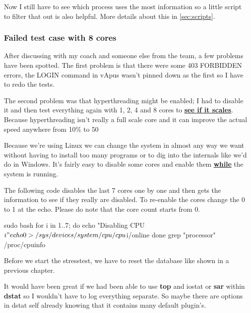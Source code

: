 Now I still have to see which process uses the most information so a little script to filter that out is also helpful. More details about this in \autoref{sec:scripts}.
\subsubsection{Failed test case with 8 cores}
After discussing with my coach and someone else from the team, a few problems have been spotted. The first problem is that there were some 403 FORBIDDEN errors, the LOGIN command in vApus wasn't pinned down as the first so I have to redo the tests.

The second problem was that \gls{hyperthreading} might be enabled; I had to disable it and then test everything again with 1, 2, 4 and 8 cores to \textbf{\underline{see if it scales}}. Because \gls{hyperthreading} isn't really a full scale core and it can improve the actual speed anywhere from 10\% to 50%

Because we're using Linux we can change the system in almost any way we want without having to install too many programs or to dig into the internals like we'd do in Windows. It's fairly easy to disable some cores and enable them \textbf{\underline{while}} the system is running.

The following code disables the last 7 cores one by one and then gets the information to see if they really are disabled. To re-enable the cores change the 0 to 1 at the echo. Please do note that the core count starts from 0.
\begin{codelisting}
sudo bash
for i in {1..7};  do
	echo "Disabling CPU$i"
	echo 0 > /sys/devices/system/cpu/cpu$i/online
done
grep "processor" /proc/cpuinfo
\end{codelisting}

Before we start the stresstest, we have to reset the database like shown in a previous chapter.

It would have been great if we had been able to use \textbf{top} and iostat or \textbf{sar} within \textbf{dstat} so I wouldn't have to log everything separate. So maybe there are options in dstat self already knowing that it contains many default plugin's.

